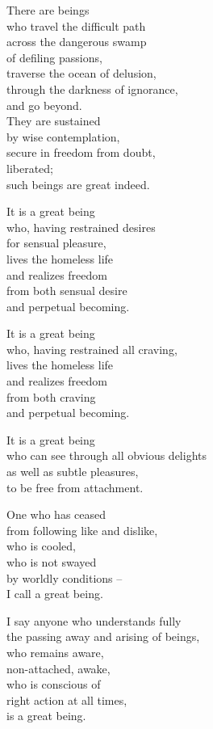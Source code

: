 There are beings\\
who travel the difficult path\\
across the dangerous swamp\\
of defiling passions,\\
traverse the ocean of delusion,\\
through the darkness of ignorance,\\
and go beyond.\\
They are sustained\\
by wise contemplation,\\
secure in freedom from doubt,\\
liberated;\\
such beings are great indeed.


It is a great being\\
who, having restrained desires\\
for sensual pleasure,\\
lives the homeless life\\
and realizes freedom\\
from both sensual desire\\
and perpetual becoming.


It is a great being\\
who, having restrained all craving,\\
lives the homeless life\\
and realizes freedom\\
from both craving\\
and perpetual becoming.


It is a great being\\
who can see through all obvious delights\\
as well as subtle pleasures,\\
to be free from attachment.


One who has ceased \\
from following like and dislike,\\
who is cooled,\\
who is not swayed \\
by worldly conditions --\\
I call a great being.


I say anyone who understands fully\\
the passing away and arising of beings,\\
who remains aware,\\
non-attached, awake,\\
who is conscious of\\
right action at all times,\\
is a great being.



